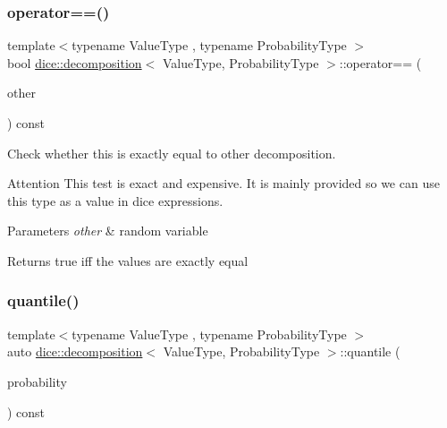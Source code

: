 \subsubsection{\texorpdfstring{operator==()}{operator==()}}
{\footnotesize\ttfamily template$<$typename Value\+Type , typename Probability\+Type $>$ \\
bool \mbox{\hyperlink{classdice_1_1decomposition}{dice\+::decomposition}}$<$ Value\+Type, Probability\+Type $>$\+::operator== (\begin{DoxyParamCaption}\item[{const \mbox{\hyperlink{classdice_1_1decomposition}{decomposition}}$<$ Value\+Type, Probability\+Type $>$ \&}]{other }\end{DoxyParamCaption}) const\hspace{0.3cm}{\ttfamily [inline]}}



Check whether this is exactly equal to other decomposition. 

\begin{DoxyAttention}{Attention}
This test is exact and expensive. It is mainly provided so we can use this type as a value in dice expressions.
\end{DoxyAttention}

\begin{DoxyParams}{Parameters}
{\em other} & random variable \\
\hline
\end{DoxyParams}
\begin{DoxyReturn}{Returns}
true iff the values are exactly equal 
\end{DoxyReturn}
\mbox{\label{classdice_1_1decomposition_a43d4eaeae0ad22bf478025cf64bbdfe8}} 
\subsubsection{\texorpdfstring{quantile()}{quantile()}}
{\footnotesize\ttfamily template$<$typename Value\+Type , typename Probability\+Type $>$ \\
auto \mbox{\hyperlink{classdice_1_1decomposition}{dice\+::decomposition}}$<$ Value\+Type, Probability\+Type $>$\+::quantile (\begin{DoxyParamCaption}\item[{Probability\+Type}]{probability }\end{DoxyParamCaption}) const\hspace{0.3cm}{\ttfamily [inline]}}



